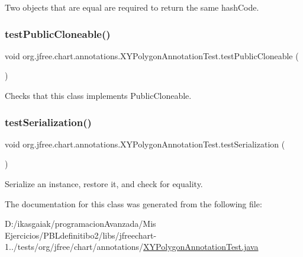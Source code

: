 Two objects that are equal are required to return the same hash\+Code. \mbox{\label{classorg_1_1jfree_1_1chart_1_1annotations_1_1_x_y_polygon_annotation_test_aa12fb7f73bbcf66859aa1363c2b8ef54}} 
\subsubsection{\texorpdfstring{test\+Public\+Cloneable()}{testPublicCloneable()}}
{\footnotesize\ttfamily void org.\+jfree.\+chart.\+annotations.\+X\+Y\+Polygon\+Annotation\+Test.\+test\+Public\+Cloneable (\begin{DoxyParamCaption}{ }\end{DoxyParamCaption})}

Checks that this class implements Public\+Cloneable. \mbox{\label{classorg_1_1jfree_1_1chart_1_1annotations_1_1_x_y_polygon_annotation_test_a123d5558197db6da899297b750ade2de}} 
\subsubsection{\texorpdfstring{test\+Serialization()}{testSerialization()}}
{\footnotesize\ttfamily void org.\+jfree.\+chart.\+annotations.\+X\+Y\+Polygon\+Annotation\+Test.\+test\+Serialization (\begin{DoxyParamCaption}{ }\end{DoxyParamCaption})}

Serialize an instance, restore it, and check for equality. 

The documentation for this class was generated from the following file\+:\begin{DoxyCompactItemize}
\item 
D\+:/ikasgaiak/programacion\+Avanzada/\+Mis Ejercicios/\+P\+B\+Ldefinitibo2/libs/jfreechart-\/1../tests/org/jfree/chart/annotations/\mbox{\hyperlink{_x_y_polygon_annotation_test_8java}{X\+Y\+Polygon\+Annotation\+Test.\+java}}\end{DoxyCompactItemize}
